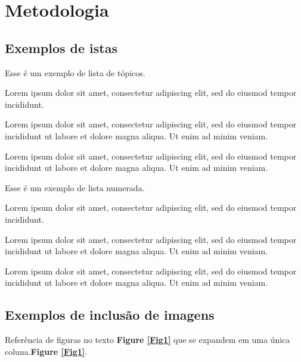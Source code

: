 \section{Metodologia}
\label{sec:metodologia}



\subsection{Exemplos de istas}

\begin{itemize}
\item Esse é um exemplo de lista de tópicos. 
{\color{blue}
\item Lorem ipsum dolor sit amet, consectetur adipiscing elit, sed do eiusmod tempor incididunt.
\item Lorem ipsum dolor sit amet, consectetur adipiscing elit, sed do eiusmod tempor incididunt ut labore et dolore magna aliqua. Ut enim ad minim veniam.
\item Lorem ipsum dolor sit amet, consectetur adipiscing elit, sed do eiusmod tempor incididunt ut labore et dolore magna aliqua. Ut enim ad minim veniam.}
\end{itemize}


\begin{enumerate}%
\item Esse é um exemplo de lista numerada.
{\color{blue}
\item Lorem ipsum dolor sit amet, consectetur adipiscing elit, sed do eiusmod tempor incididunt.
\item Lorem ipsum dolor sit amet, consectetur adipiscing elit, sed do eiusmod tempor incididunt ut labore et dolore magna aliqua. Ut enim ad minim veniam.
\item Lorem ipsum dolor sit amet, consectetur adipiscing elit, sed do eiusmod tempor incididunt ut labore et dolore magna aliqua. Ut enim ad minim veniam.}
\end{enumerate}



\subsection{Exemplos de inclusão de imagens}

Referência de figuras no texto \textbf{Figure \ref{Fig1}} que se expandem em uma única coluna.\textbf{Figure \ref{Fig1}}.


